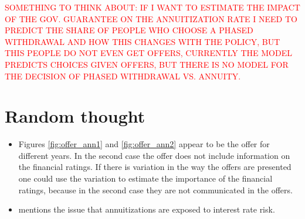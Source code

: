 \documentclass[12pt]{article}
\theoremstyle{plain}
\theoremstyle{plain}
\begin{document}
\textcolor{red}{SOMETHING TO THINK ABOUT: IF I WANT TO ESTIMATE THE IMPACT OF THE GOV. GUARANTEE ON THE ANNUITIZATION RATE I NEED TO PREDICT THE SHARE OF PEOPLE WHO CHOOSE A PHASED WITHDRAWAL AND HOW THIS CHANGES WITH THE POLICY, BUT THIS PEOPLE DO NOT EVEN GET OFFERS, CURRENTLY THE MODEL PREDICTS CHOICES GIVEN OFFERS, BUT THERE IS NO MODEL FOR THE DECISION OF PHASED WITHDRAWAL VS. ANNUITY.  }


\section{Random thought}
\begin{itemize}
    \item Figures \ref{fig:offer_ann1} and \ref{fig:offer_ann2} appear to be the offer for different years. In the second case the offer does not include information on the financial ratings. If there is variation in the way the offers are presented one could use the variation to estimate the importance of the financial ratings, because in the second case they are not communicated in the offers. 

    \item \textcite[p.16]{james_pensiones_2005} mentions the issue that annuitizations are exposed to interest rate risk. 
\end{itemize}


 


\newpage
\printbibliography

 
\end{document}
